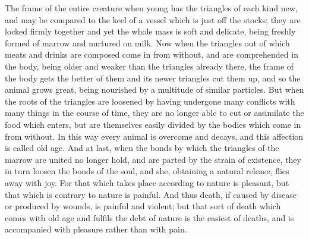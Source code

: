 The frame of the entire creature when young has the triangles of each kind
new, and may be compared to the keel of a vessel which is just off the
stocks; they are locked firmly together and yet the whole mass is soft and
delicate, being freshly formed of marrow and nurtured on milk. Now when
the triangles out of which meats and drinks are composed come in from
without, and are comprehended in the body, being older and weaker than the
triangles already there, the frame of the body gets the better of them and
its newer triangles cut them up, and so the animal grows great, being
nourished by a multitude of similar particles. But when the roots of the
triangles are loosened by having undergone many conflicts with many things
in the course of time, they are no longer able to cut or assimilate the
food which enters, but are themselves easily divided by the bodies which
come in from without. In this way every animal is overcome and decays, and
this affection is called old age. And at last, when the bonds by which the
triangles of the marrow are united no longer hold, and are parted by the
strain of existence, they in turn loosen the bonds of the soul, and she,
obtaining a natural release, flies away with joy. For that which takes
place according to nature is pleasant, but that which is contrary to
nature is painful. And thus death, if caused by disease or produced by
wounds, is painful and violent; but that sort of death which comes with
old age and fulfils the debt of nature is the easiest of deaths, and is
accompanied with pleasure rather than with pain.


